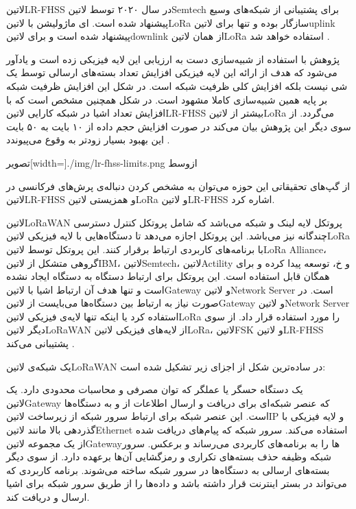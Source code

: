 ‌لاتین{LR-FHSS} در سال ۲۰۲۰ توسط ‌لاتین{Semtech} برای پشتیبانی از شبکه‌های وسیع پیشنهاد شده است.
ای ماژولیشن با ‌لاتین{LoRa} سازگار بوده و تنها برای ‌لاتین{uplink} پیشنهاد شده است و برای ‌لاتین{downlink} از همان
‌لاتین{LoRa} استفاده خواهد شد
.

پژوهش  با استفاده از شبیه‌سازی دست به ارزیابی این لایه فیزیکی زده است و یادآور می‌شود که هدف از ارائه این لایه فیزیکی
افزایش تعداد بسته‌های ارسالی توسط یک شی نیست بلکه افزایش کلی ظرفیت شبکه است. در شکل  این افزایش ظرفیت شبکه بر پایه همین
شبیه‌سازی کاملا مشهود است. در شکل  همچنین مشخص است که با افزایش تعداد اشیا در شبکه کارایی ‌لاتین{LR-FHSS} بیشتر از ‌لاتین{LoRa}
می‌گردد. از سوی دیگر این پژوهش بیان می‌کند در صورت افزایش حجم داده از ۱۰ بایت به ۵۰ بایت این بهبود بسیار زودتر به وقوع می‌پیوندد
.

‌تصویر[width=\textwidth]{./img/lr-fhss-limits.png}
‌ازوسط

از گپ‌های تحقیقاتی این حوزه می‌توان به مشخص کردن دنباله‌ی پرش‌های فرکانسی در ‌لاتین{LR-FHSS} و همزیستی ‌لاتین{LoRa} و ‌لاتین{LR-FHSS} اشاره کرد.


‌لاتین{LoRaWAN} پروتکل لایه لینک و شبکه می‌باشد که شامل پروتکل کنترل دسترسی چندگانه نیز می‌باشد.
این پروتکل اجازه می‌دهد تا دستگاه‌هایی با لایه فیزیکی ‌لاتین{LoRa} با برنامه‌های کاربردی ارتباط برقرار کنند.
این پروتکل توسط ‌لاتین{LoRa Alliance}، گروهی متشکل از ‌لاتین{IBM}، ‌لاتین{Semtech}، ‌لاتین{Actility} و ‌خ،
توسعه پیدا کرده و برای همگان قابل استفاده است.
این پروتکل برای ارتباط دستگاه به دستگاه ایجاد نشده است و تنها هدف آن ارتباط اشیا با ‌لاتین{Gateway} و ‌لاتین{Network Server} است.
در صورت نیاز به ارتباط بین دستگاه‌ها می‌بایست از ‌لاتین{Gateway} و ‌لاتین{Network Server} استفاده کرد یا اینکه
تنها لایه‌ی فیزیکی ‌لاتین{LoRa} را مورد استفاده قرار داد.
از سوی دیگر ‌لاتین{LoRaWAN} از لایه‌های فیزیکی ‌لاتین{LoRa}، ‌لاتین{FSK} و ‌لاتین{LR-FHSS} پشتیبانی می‌کند
.

یک شبکه‌ی ‌لاتین{LoRaWAN} در ساده‌ترین شکل از اجزای زیر تشکیل شده است:

 یک دستگاه حسگر یا عملگر که توان مصرفی و محاسبات محدودی دارد.
 یک ‌لاتین{Gateway} که عنصر شبکه‌ای برای دریافت و ارسال اطلاعات از و به دستگاه‌ها است. این عنصر شبکه برای ارتباط سرور شبکه
از زیرساخت ‌لاتین{IP} و لایه فیزیکی با گذردهی بالا مانند ‌لاتین{Ethernet} استفاده می‌کند.
 سرور شبکه که پیام‌های دریافت شده از یک مجموعه ‌لاتین{Gateway}ها را به برنامه‌های کاربردی می‌رساند و برعکس.
سرور شبکه وظیفه حذف بسته‌های تکراری
و رمزگشایی آن‌ها برعهده دارد. از سوی دیگر بسته‌های ارسالی به دستگاه‌ها در سرور شبکه ساخته می‌شوند.
 برنامه کاربردی که می‌تواند در بستر اینترنت قرار داشته باشد و داده‌ها را از طریق سرور شبکه برای اشیا ارسال و دریافت کند.

